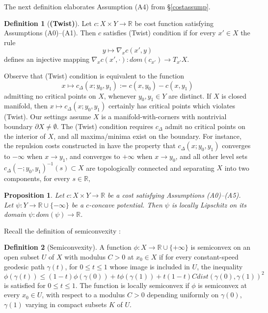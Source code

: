 \documentclass[12pt]{amsart}
\newtheorem{prop}{Proposition}
\theoremstyle{definition}
\newtheorem{dfn}{Definition}
\theoremstyle{remark}
\newcommand{\bR}{\mathbb{R}}
\newcommand{\del}{\partial}
\newcommand{\cd}{c_\Delta}
\begin{document}
The next definition elaborates Assumption (A4) from \S \ref{costassump}.
\begin{dfn}[\textbf{(Twist)}]\label{twistdef}
Let $c: X\times Y \to \bR$ be cost function satisfying Assumptions (A0)--(A1). Then $c$ satisfies (Twist) condition if for every $x'\in X$ the rule $$y\mapsto \nabla_x c(x',y) $$ defines an injective mapping $\nabla_x c(x',\cdot):dom(c_{x'})\to T_{x'} X$. 
\end{dfn}

Observe that (Twist) condition is equivalent to the function $$x\mapsto \cd(x;y_0, y_1):=c(x,y_0)-c(x,y_1)$$ admitting no critical points on $X$, whenever $y_0, y_1 \in Y$ are distinct. If $X$ is closed manifold, then $x\mapsto \cd(x;y_0,y_1)$ certainly has critical points which violates (Twist). Our settings assume $X$ is a manifold-with-corners with nontrivial boundary $\del X \neq \emptyset$. The (Twist) condition requires $\cd$ admit no critical points on the interior of $X$, and all maxima/minima exist on the boundary. For instance, the repulsion costs constructed in \cite{martel} have the property that $\cd(x;y_0,y_1)$ converges to $-\infty$ when $x\to y_1$, and converges to $+\infty$ when $x\to y_0$, and all other level sets $\cd(-;y_0,y_1)^{-1}(s) \subset X$ are topologically connected and separating $X$ into two components, for every $s\in \bR$,  


\begin{prop}\label{lipsi}
Let $c: X\times Y \to \bR$ be a cost satisfying Assumptions (A0)--(A5). Let $\psi: Y\to \bR \cup \{-\infty\}$ be a $c$-concave potential. Then $\psi$ is locally Lipschitz on its domain $\psi: dom(\psi) \to \bR$. 
\end{prop}

Recall the definition of semiconvexity \cite[Definition 10.10, pp.228]{Vil1}: 
\begin{dfn}[Semiconvexity]
A function $\phi: X \to \bR \cup \{+\infty\}$ is semiconvex on an open subset $U$ of $X$ with modulus $C>0$ at $x_0\in X$ if for every constant-speed geodesic path $\gamma(t)$, for $0\leq t\leq 1$ whose image is included in $U$, the inequality 
\begin{equation}\phi(\gamma(t)) \leq (1-t) \phi(\gamma(0)) +t \phi(\gamma(1)) +t(1-t) C dist(\gamma(0), \gamma(1))^2 \label{scineq} 
\end{equation} is satisfied for $0\leq t \leq 1$.
The function is locally semiconvex if $\phi$ is semiconvex at every $x_0\in U$, with respect to a modulus $C>0$ depending uniformly on $\gamma(0)$, $\gamma(1)$ varying in compact subsets $K$ of $U$. 
\end{dfn}
\end{document}
